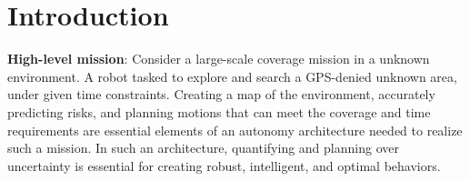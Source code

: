 \documentclass{article}
\newcommand{\ph}[1]{{\textbf{#1}:}} %
\begin{document}








\section{Introduction}

\ph{High-level mission} Consider a large-scale coverage mission in a unknown environment. A robot tasked to explore and search a GPS-denied unknown area, under given time constraints. Creating a map of the environment, accurately predicting risks, and planning motions that can meet the coverage and time requirements are essential elements of an autonomy architecture needed to realize such a mission.  In such an architecture, quantifying and planning over uncertainty is essential for creating robust, intelligent, and optimal behaviors.


%
%
\end{document}
